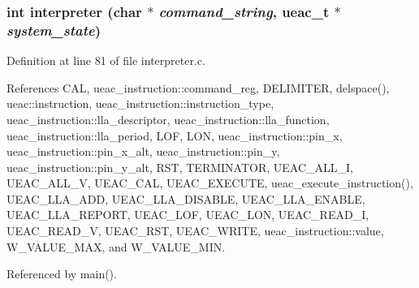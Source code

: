 \subsubsection{\setlength{\rightskip}{0pt plus 5cm}int interpreter (char $\ast$ {\em command\_\-string}, {\bf ueac\_\-t} $\ast$ {\em system\_\-state})}\label{interpreter_8c_a9}




Definition at line 81 of file interpreter.c.

References CAL, ueac\_\-instruction::command\_\-reg, DELIMITER, delspace(), ueac::instruction, ueac\_\-instruction::instruction\_\-type, ueac\_\-instruction::lla\_\-descriptor, ueac\_\-instruction::lla\_\-function, ueac\_\-instruction::lla\_\-period, LOF, LON, ueac\_\-instruction::pin\_\-x, ueac\_\-instruction::pin\_\-x\_\-alt, ueac\_\-instruction::pin\_\-y, ueac\_\-instruction::pin\_\-y\_\-alt, RST, TERMINATOR, UEAC\_\-ALL\_\-I, UEAC\_\-ALL\_\-V, UEAC\_\-CAL, UEAC\_\-EXECUTE, ueac\_\-execute\_\-instruction(), UEAC\_\-LLA\_\-ADD, UEAC\_\-LLA\_\-DISABLE, UEAC\_\-LLA\_\-ENABLE, UEAC\_\-LLA\_\-REPORT, UEAC\_\-LOF, UEAC\_\-LON, UEAC\_\-READ\_\-I, UEAC\_\-READ\_\-V, UEAC\_\-RST, UEAC\_\-WRITE, ueac\_\-instruction::value, W\_\-VALUE\_\-MAX, and W\_\-VALUE\_\-MIN.

Referenced by main().

